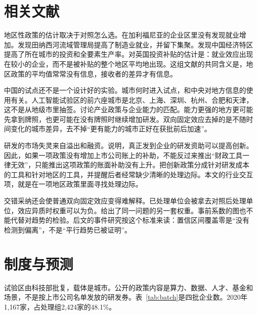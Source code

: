 \documentclass[12pt,hyperref,a4paper,UTF8]{ctexart}
\begin{document}
\section{相关文献}

地区性政策的估计取决于对照怎么选。\textcite{neumark2011enterprise}在加利福尼亚的企业区里没有发现就业增加。\textcite{kline2014local}发现田纳西河流域管理局提高了制造业就业，并留下集聚。\textcite{wang2013sez}发现中国经济特区提高了所在城市的投资和全要素生产率。\textcite{criscuolo2019industrial}对英国投资补贴的估计是：就业效应出现在较小的企业，而不是被补贴的整个地区平均地出现。这组文献的共同含义是，地区政策的平均值常常没有信息，接收者的差异才有信息。

中国的试点还不是一个设计好的实验。城市何时进入试点，和中央对地方信息的使用有关\parencite{wang2021experimentation}。人工智能试验区的前六座城市是北京、上海、深圳、杭州、合肥和天津，这不是从地级市里抽签。\textcite{lu2017industrial}讨论产业政策与企业能力的匹配。能力更强的地方更可能先拿到牌照，也更可能在没有牌照时继续增加研发。双向固定效应去掉的是不随时间变化的城市差异，去不掉“更有能力的城市正好在获批前后加速”。

研发的市场失灵来自溢出和融资\parencite{hall2010financing}。\textcite{howell2017financing}说明，真正发到企业的研发资助可以提高创新。因此，如果一项政策没有增加上市公司账上的补助，不能反过来推出“财政工具一律无效”，只能推出这项政策的账面补助没有上升。\textcite{bloom2019toolkit}把创新政策分成针对研发成本的工具和针对地区的工具，并提醒后者经常缺少清晰的处理边际。本文的行业交互项，就是在一项地区政策里面寻找处理边际。

交错采纳还会使普通双向固定效应变得难解释。已处理单位会被拿去对照后处理单位，效应异质时权重可以为负\parencite{goodman2021difference,sun2021estimating,callaway2021difference}。\textcite{dechaisemartin2020twoway}给出了同一问题的另一套权重。事前系数的图也不能代替对趋势的检验\parencite{roth2023trending}。后文的事件研究按这个标准来读：置信区间覆盖零是“没有检测到偏离”，不是“平行趋势已被证明”。

\section{制度与预测}

试验区由科技部批复，载体是城市。公开的政策内容是算力、数据、人才、基金和场景，不是按上市公司名单发放的研发券。表~\ref{tab:batch}是四批企业数。2020年1,167家，占处理组2,424家的48.1\%。
\end{document}
